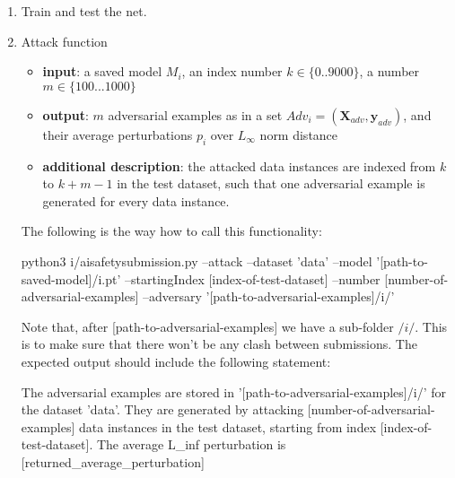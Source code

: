 \iffalse
\begin{enumerate}
\item Train and test the net.

    \item Attack function
    \begin{itemize}
        \item \textbf{input}: a saved model $M_i$, an index number $k\in \{0..9000\}$, a number $m\in\{100...1000\}$
        \item \textbf{output}: $m$ adversarial examples as in a set $Adv_i = (\textbf{X}_{adv},\textbf{y}_{adv})$, and their average perturbations $p_i$ over $L_\infty$ norm distance
        \item \textbf{additional description}: the attacked data instances are indexed from $k$ to $k+m-1$ in the test dataset, such that one adversarial example is generated for every data instance. 
    \end{itemize}
The following is the way how to call this functionality: 
\begin{cmds}
python3 i/aisafetysubmission.py --attack --dataset 'data' --model '[path-to-saved-model]/i.pt' --startingIndex [index-of-test-dataset] --number [number-of-adversarial-examples] --adversary '[path-to-adversarial-examples]/i/'
\end{cmds}
Note that, after [path-to-adversarial-examples] we have a sub-folder $/i/$. This is to make sure that  there won't be any clash between submissions. The expected output should include the following statement: 
\begin{cmds}
The adversarial examples are stored in '[path-to-adversarial-examples]/i/' for the dataset 'data'. They are generated by attacking [number-of-adversarial-examples] data instances in the test dataset, starting from index [index-of-test-dataset]. The average L_inf perturbation is [returned_average_perturbation]

\end{cmds}
\end{enumerate}
